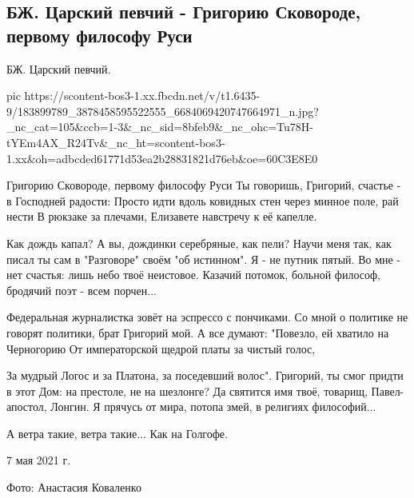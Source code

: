  
 
 
 
 

\subsection{БЖ. Царский певчий - Григорию Сковороде, первому философу Руси}

БЖ. Царский певчий.


\ifcmt
  pic https://scontent-bos3-1.xx.fbcdn.net/v/t1.6435-9/183899789_3878458595522555_6684069420747664971_n.jpg?_nc_cat=105&ccb=1-3&_nc_sid=8bfeb9&_nc_ohc=Tu78H-tYEm4AX_R24Tv&_nc_ht=scontent-bos3-1.xx&oh=adbcded61771d53ea2b28831821d76eb&oe=60C3E8E0
\fi


Григорию Сковороде, первому философу Руси
Ты говоришь, Григорий, счастье - в Господней радости:
Просто идти вдоль ковидных стен через минное поле, рай нести
В рюкзаке за плечами, Елизавете навстречу к её капелле.

Как дождь капал? А вы, дождинки серебряные, как пели?
Научи меня так, как писал ты сам в "Разговоре" своём "об истинном".
Я - не путник пятый. Во мне - нет счастья: лишь небо твоё неистовое.
Казачий потомок, больной философ, бродячий поэт - всем порчен...

Федеральная журналистка зовёт на эспрессо с пончиками.
Со мной о политике не говорят политики, брат Григорий мой.
А все думают: "Повезло, ей хватило на Черногорию
От императорской щедрой платы за чистый голос,

За мудрый Логос и за Платона, за поседевший волос".
Григорий, ты смог придти в этот Дом: на престоле, не на шезлонге?
Да святится имя твоё, товарищ, Павел-апостол, Лонгин.
Я прячусь от мира, потопа змей, в религиях философий...

А ветра такие, ветра такие...
Как на Голгофе.

7 мая 2021 г.

Фото: Анастасия Коваленко
